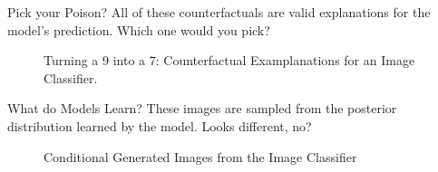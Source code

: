 \documentclass[
  ignorenonframetext,
]{beamer}
\theoremstyle{definition}
\theoremstyle{remark}
\begin{document}
\begin{frame}{Pick your Poison?}
\label{pick-your-poison}
All of these counterfactuals are valid explanations for the model's
prediction. Which one would you pick?

\begin{figure}


\caption{\label{fig-cf-example}Turning a 9 into a 7: Counterfactual
Examplanations for an Image Classifier.}

\end{figure}%
\end{frame}

\begin{frame}{What do Models Learn?}
\label{what-do-models-learn}
These images are sampled from the posterior distribution learned by the
model. Looks different, no?

\begin{figure}


\caption{\label{fig-learn}Conditional Generated Images from the Image
Classifier}

\end{figure}%
\end{frame}
\end{document}
